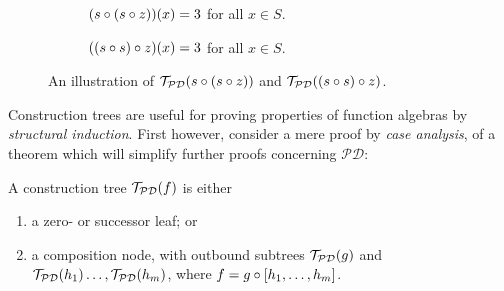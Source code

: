 \begin{figure}[h!]
\centering
%
\begin{subfigure}{0.49\textwidth}
\centering
{}
\caption[]{${\mathopen{}\left({s \circ {\ensuremath{\mathopen{}\left({s \circ z}\right)\mathclose{}}}}\right)\mathclose{}}{\mathopen{}\left({x}\right)\mathclose{}} = 3$ for all $x \in S$.}
\end{subfigure}
%
\begin{subfigure}{0.49\textwidth}
\centering
{}
\caption[]{${\mathopen{}\left({{\mathopen{}\left({s \circ s}\right)\mathclose{}} \circ z}\right)\mathclose{}}{\mathopen{}\left({x}\right)\mathclose{}} = 3$ for all $x \in S$.}
\end{subfigure}
\caption[]{An illustration of $\mathcal{T}_\mathcal{PD}{\mathopen{}\left({s \circ {\ensuremath{\mathopen{}\left({s \circ
z}\right)\mathclose{}}}}\right)\mathclose{}}$ and $\mathcal{T}_\mathcal{PD}{\mathopen{}\left({{\mathopen{}\left({s \circ s}\right)\mathclose{}} \circ z}\right)\mathclose{}}$.}
\label{fig:mirror-s-s-z}
\end{figure}

Construction trees are useful for proving properties of function algebras by
\emph{structural induction}. First however, consider a mere proof by \emph{case
analysis}, of a theorem which will simplify further proofs concerning
$\mathcal{PD}$:

\begin{theorem} \label{thm:construction-tree-p} A construction tree
$\mathcal{T}_\mathcal{PD}{\mathopen{}\left({f}\right)\mathclose{}}$ is either\begin{enumerate}[label=(\arabic*)]

\item a zero- or successor leaf; or

\item a composition node, with outbound subtrees
$\mathcal{T}_\mathcal{PD}{\mathopen{}\left({g}\right)\mathclose{}}$ and $\mathcal{T}_\mathcal{PD}{\mathopen{}\left({h_1}\right)\mathclose{}} \ldots,
\mathcal{T}_\mathcal{PD}{\mathopen{}\left({h_m}\right)\mathclose{}}$, where $f = g \circ \mathopen{}\left[{h_1, \ldots, h_m}\right]\mathclose{}$.

\end{enumerate}\end{theorem}

